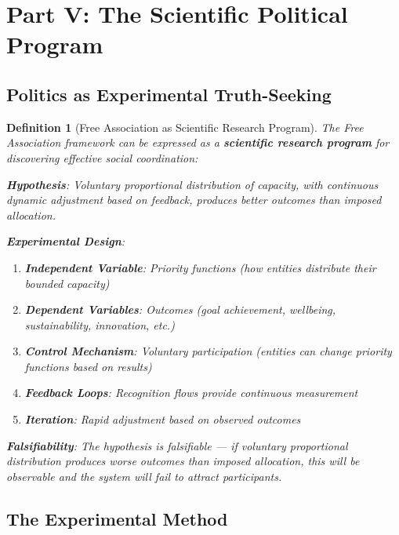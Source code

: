 \documentclass[11pt]{article}
\newtheorem{definition}{Definition}
\begin{document}
\section{Part V: The Scientific Political Program}

\subsection{Politics as Experimental Truth-Seeking}

\begin{definition}[Free Association as Scientific Research Program]
The Free Association framework can be expressed as a \textbf{scientific research program} for discovering effective social coordination:

\textbf{Hypothesis}: Voluntary proportional distribution of capacity, with continuous dynamic adjustment based on feedback, produces better outcomes than imposed allocation.

\textbf{Experimental Design}:
\begin{enumerate}
\item \textbf{Independent Variable}: Priority functions (how entities distribute their bounded capacity)
\item \textbf{Dependent Variables}: Outcomes (goal achievement, wellbeing, sustainability, innovation, etc.)
\item \textbf{Control Mechanism}: Voluntary participation (entities can change priority functions based on results)
\item \textbf{Feedback Loops}: Recognition flows provide continuous measurement
\item \textbf{Iteration}: Rapid adjustment based on observed outcomes
\end{enumerate}

\textbf{Falsifiability}: The hypothesis is falsifiable — if voluntary proportional distribution produces worse outcomes than imposed allocation, this will be observable and the system will fail to attract participants.
\end{definition}

\subsection{The Experimental Method}
\end{document}

